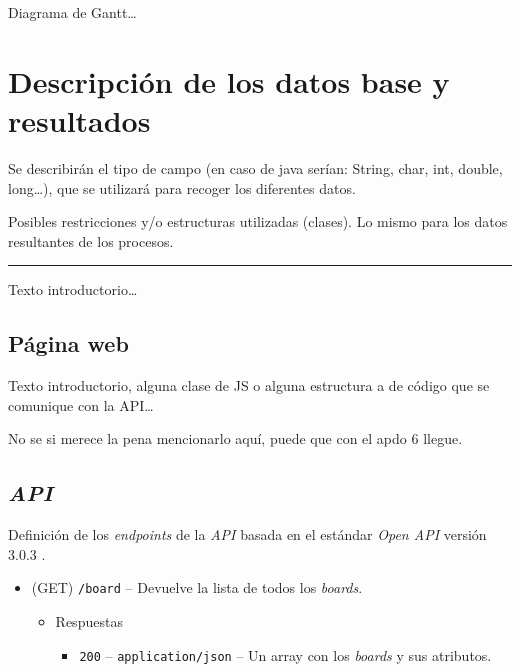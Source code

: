 \documentclass[12pt,a4paper,titlepage]{article}
\begin{document}
    Diagrama de Gantt\dots

    \section{Descripción de los datos base y resultados}

    Se describirán el tipo de campo (en caso de java serían: String, char, int, double, long\dots), que se utilizará para recoger los diferentes datos.

    Posibles restricciones y/o estructuras utilizadas (clases). Lo mismo para los datos resultantes de los procesos.

    \bigskip\hrule\bigskip

    Texto introductorio\dots

    \subsection{Página web}

    Texto introductorio, alguna clase de JS o alguna estructura a de código que se comunique con la API\dots

    No se si merece la pena mencionarlo aquí, puede que con el apdo 6 llegue.

    \subsection{\textit{API}}

    Definición de los \textit{endpoints} de la \textit{API} basada en el estándar \textit{Open API} versión 3.0.3 \cite{swagger:specification}.

    \begin{itemize}
        \item (GET) \texttt{/board} -- Devuelve la lista de todos los \textit{boards}.
        \begin{itemize}
            \item Respuestas
            \begin{itemize}
                \item \texttt{200} -- \texttt{application/json} -- Un array con los \textit{boards} y sus atributos.
            \end{itemize}
        \end{itemize}
    \end{itemize}

    
\end{document}

